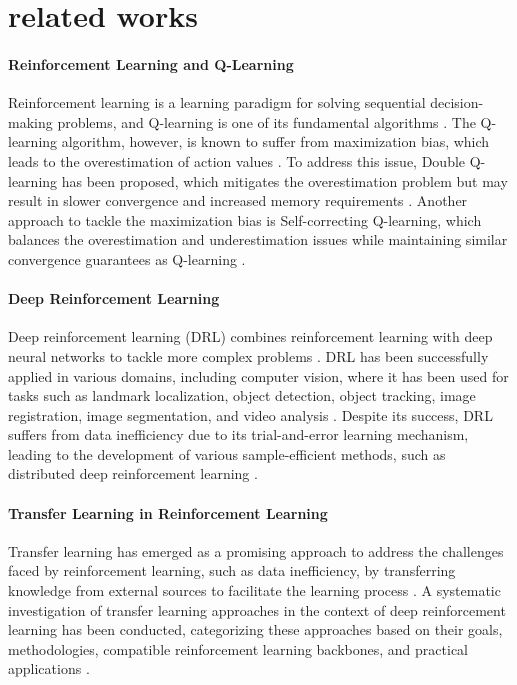 \section{related works}
\paragraph{Reinforcement Learning and Q-Learning}
Reinforcement learning is a learning paradigm for solving sequential decision-making problems, and Q-learning is one of its fundamental algorithms \cite{2009.07888}. The Q-learning algorithm, however, is known to suffer from maximization bias, which leads to the overestimation of action values \cite{2012.01100}. To address this issue, Double Q-learning has been proposed, which mitigates the overestimation problem but may result in slower convergence and increased memory requirements \cite{2303.08631}. Another approach to tackle the maximization bias is Self-correcting Q-learning, which balances the overestimation and underestimation issues while maintaining similar convergence guarantees as Q-learning \cite{2012.01100}.

\paragraph{Deep Reinforcement Learning}
Deep reinforcement learning (DRL) combines reinforcement learning with deep neural networks to tackle more complex problems \cite{2108.11510}. DRL has been successfully applied in various domains, including computer vision, where it has been used for tasks such as landmark localization, object detection, object tracking, image registration, image segmentation, and video analysis \cite{2108.11510}. Despite its success, DRL suffers from data inefficiency due to its trial-and-error learning mechanism, leading to the development of various sample-efficient methods, such as distributed deep reinforcement learning \cite{2212.00253}.

\paragraph{Transfer Learning in Reinforcement Learning}
Transfer learning has emerged as a promising approach to address the challenges faced by reinforcement learning, such as data inefficiency, by transferring knowledge from external sources to facilitate the learning process \cite{2009.07888}. A systematic investigation of transfer learning approaches in the context of deep reinforcement learning has been conducted, categorizing these approaches based on their goals, methodologies, compatible reinforcement learning backbones, and practical applications \cite{2009.07888}.

